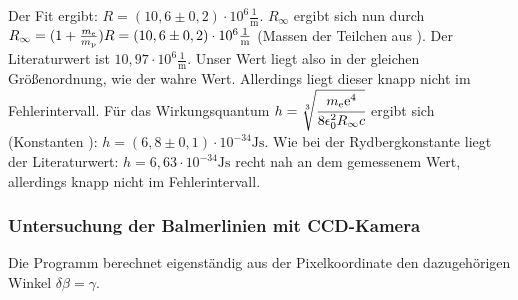 Der Fit ergibt: $R = (10,6 \pm 0,2)\cdot 10^6\frac{1}{\si{\metre}}$. $R_\infty$ ergibt sich nun durch $R_\infty = (1+\frac{m_\mathrm{e}}{m_\mathrm{p}}) R = (10,6 \pm 0,2)\cdot 10^6\frac{1}{\si{\metre}}$ (Massen der Teilchen aus \cite{wiki_konst}). Der Literaturwert \cite{wiki_konst} ist $10,97 \cdot 10^6\frac{1}{\si{\metre}}$. Unser Wert liegt also in der gleichen Größenordnung, wie der wahre Wert. Allerdings liegt dieser knapp nicht im Fehlerintervall. Für das Wirkungsquantum $h = \sqrt[3]{\cfrac{m_\mathrm{e}\mathrm{e}^4}{8\epsilon_0^2R_\infty c}}$ ergibt sich (Konstanten \cite{wiki_konst}): $h = (6,8 \pm 0,1) \cdot 10^{-34} \si{\joule \second}$. Wie bei der Rydbergkonstante liegt der Literaturwert: $h = 6,63 \cdot 10^{-34} \si{\joule \second}$ recht nah an dem gemessenem Wert, allerdings knapp nicht im Fehlerintervall.

\subsubsection{Untersuchung der Balmerlinien mit CCD-Kamera}
Die Programm berechnet eigenständig aus der Pixelkoordinate den dazugehörigen Winkel $\delta  \beta = \gamma$. 

